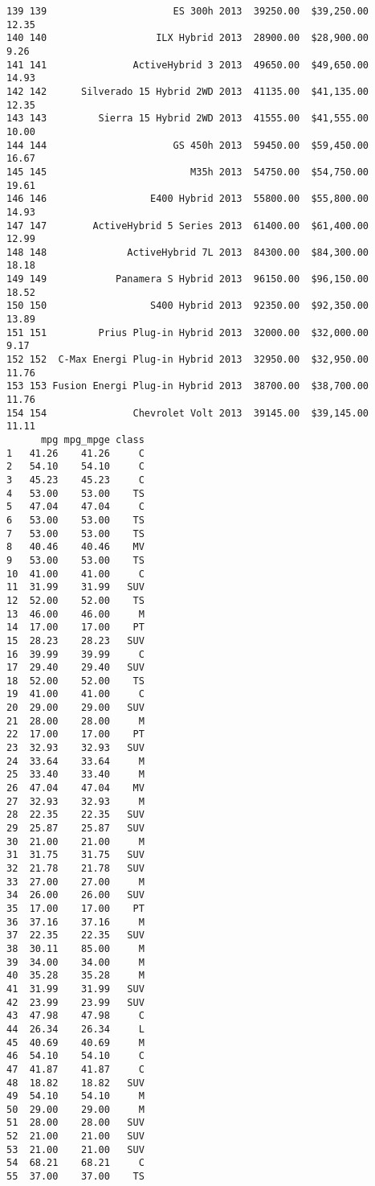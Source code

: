 \documentclass[
  letterpaper,
  DIV=11,
  numbers=noendperiod]{scrreprt}
\begin{document}
\begin{verbatim}
139 139                      ES 300h 2013  39250.00  $39,250.00       12.35
140 140                   ILX Hybrid 2013  28900.00  $28,900.00        9.26
141 141               ActiveHybrid 3 2013  49650.00  $49,650.00       14.93
142 142      Silverado 15 Hybrid 2WD 2013  41135.00  $41,135.00       12.35
143 143         Sierra 15 Hybrid 2WD 2013  41555.00  $41,555.00       10.00
144 144                      GS 450h 2013  59450.00  $59,450.00       16.67
145 145                         M35h 2013  54750.00  $54,750.00       19.61
146 146                  E400 Hybrid 2013  55800.00  $55,800.00       14.93
147 147        ActiveHybrid 5 Series 2013  61400.00  $61,400.00       12.99
148 148              ActiveHybrid 7L 2013  84300.00  $84,300.00       18.18
149 149            Panamera S Hybrid 2013  96150.00  $96,150.00       18.52
150 150                  S400 Hybrid 2013  92350.00  $92,350.00       13.89
151 151         Prius Plug-in Hybrid 2013  32000.00  $32,000.00        9.17
152 152  C-Max Energi Plug-in Hybrid 2013  32950.00  $32,950.00       11.76
153 153 Fusion Energi Plug-in Hybrid 2013  38700.00  $38,700.00       11.76
154 154               Chevrolet Volt 2013  39145.00  $39,145.00       11.11
      mpg mpg_mpge class
1   41.26    41.26     C
2   54.10    54.10     C
3   45.23    45.23     C
4   53.00    53.00    TS
5   47.04    47.04     C
6   53.00    53.00    TS
7   53.00    53.00    TS
8   40.46    40.46    MV
9   53.00    53.00    TS
10  41.00    41.00     C
11  31.99    31.99   SUV
12  52.00    52.00    TS
13  46.00    46.00     M
14  17.00    17.00    PT
15  28.23    28.23   SUV
16  39.99    39.99     C
17  29.40    29.40   SUV
18  52.00    52.00    TS
19  41.00    41.00     C
20  29.00    29.00   SUV
21  28.00    28.00     M
22  17.00    17.00    PT
23  32.93    32.93   SUV
24  33.64    33.64     M
25  33.40    33.40     M
26  47.04    47.04    MV
27  32.93    32.93     M
28  22.35    22.35   SUV
29  25.87    25.87   SUV
30  21.00    21.00     M
31  31.75    31.75   SUV
32  21.78    21.78   SUV
33  27.00    27.00     M
34  26.00    26.00   SUV
35  17.00    17.00    PT
36  37.16    37.16     M
37  22.35    22.35   SUV
38  30.11    85.00     M
39  34.00    34.00     M
40  35.28    35.28     M
41  31.99    31.99   SUV
42  23.99    23.99   SUV
43  47.98    47.98     C
44  26.34    26.34     L
45  40.69    40.69     M
46  54.10    54.10     C
47  41.87    41.87     C
48  18.82    18.82   SUV
49  54.10    54.10     M
50  29.00    29.00     M
51  28.00    28.00   SUV
52  21.00    21.00   SUV
53  21.00    21.00   SUV
54  68.21    68.21     C
55  37.00    37.00    TS

\end{verbatim}
\end{document}
